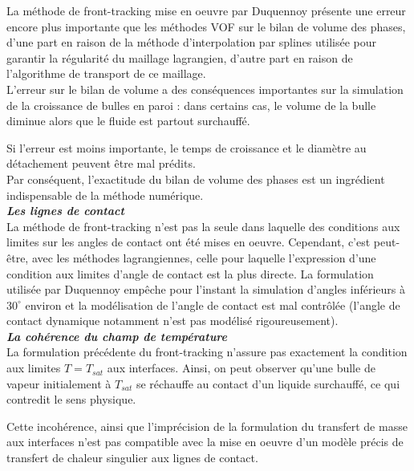 La m\'ethode de front-tracking mise en oeuvre par Duquennoy pr\'esente une erreur encore plus importante
que les m\'ethodes VOF sur le bilan de volume des phases,
d'une part en raison de la m\'ethode d'interpolation par splines utilis\'ee pour garantir
la r\'egularit\'e du maillage lagrangien,
d'autre part en raison de l'algorithme de transport de ce maillage.\\

L'erreur sur le bilan de volume a des cons\'equences importantes
sur la simulation de la croissance de bulles en paroi :
dans certains cas, le volume de la bulle diminue alors que le fluide est partout surchauff\'e.

Si l'erreur est moins importante, le temps de croissance
et le diam\`etre au d\'etachement peuvent \^etre mal pr\'edits.\\

Par cons\'equent, l'exactitude du bilan de volume des phases
est un ingr\'edient indispensable de la m\'ethode num\'erique.
\smallskip \\

\textit{\textbf{Les lignes de contact}}
\smallskip \\

La m\'ethode de front-tracking \cite{Duquennoy2000} n'est pas la seule dans laquelle
des conditions aux limites sur les angles de contact ont \'et\'e mises en oeuvre.
Cependant, c'est peut-\^etre, avec les m\'ethodes lagrangiennes, celle pour laquelle l'expression
d'une condition aux limites d'angle de contact est la plus directe.
La formulation utilis\'ee par Duquennoy emp\^eche pour l'instant la simulation
d'angles inf\'erieurs \`a $30^{\circ}$ environ
et la mod\'elisation de l'angle de contact est mal contr\^ol\'ee
(l'angle de contact dynamique notamment n'est pas mod\'elis\'e rigoureusement). 
\smallskip \\

\textit{\textbf{La coh\'erence du champ de temp\'erature}}
\smallskip \\

La formulation pr\'ec\'edente du front-tracking n'assure pas exactement la
condition aux limites $T = T_{sat}$ aux interfaces.
Ainsi, on peut observer qu'une bulle de vapeur initialement \`a $T_{sat}$ se r\'echauffe
au contact d'un liquide surchauff\'e, ce qui contredit le sens physique.

Cette incoh\'erence, ainsi que l'impr\'ecision de la formulation du transfert de masse aux interfaces n'est pas
compatible avec la mise en oeuvre d'un mod\`ele pr\'ecis de transfert de chaleur singulier aux lignes de contact.


